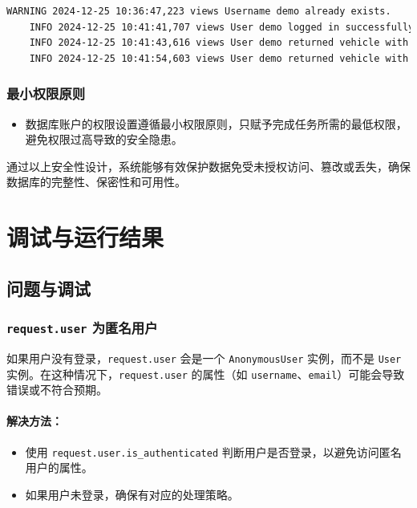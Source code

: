 \documentclass[UTF8,a4paper,12pt]{ctexart}
\begin{document}
\begin{lstlisting}[language=bash]
    WARNING 2024-12-25 10:36:47,223 views Username demo already exists.
    INFO 2024-12-25 10:41:41,707 views User demo logged in successfully.
    INFO 2024-12-25 10:41:43,616 views User demo returned vehicle with ID XPENG001.
    INFO 2024-12-25 10:41:54,603 views User demo returned vehicle with ID XPENG001.
\end{lstlisting}

\subsubsection{最小权限原则}
\begin{itemize}
    \item 数据库账户的权限设置遵循最小权限原则，只赋予完成任务所需的最低权限，避免权限过高导致的安全隐患。
\end{itemize}

通过以上安全性设计，系统能够有效保护数据免受未授权访问、篡改或丢失，确保数据库的完整性、保密性和可用性。

\section{调试与运行结果}
\subsection{问题与调试}


\subsubsection{\texttt{request.user} 为匿名用户}

如果用户没有登录，\texttt{request.user} 会是一个 \texttt{AnonymousUser} 实例，而不是 \texttt{User} 实例。在这种情况下，\texttt{request.user} 的属性（如 \texttt{username}、\texttt{email}）可能会导致错误或不符合预期。

\paragraph{解决方法：}
\begin{itemize}
    \item 使用 \texttt{request.user.is\_authenticated} 判断用户是否登录，以避免访问匿名用户的属性。
    \item 如果用户未登录，确保有对应的处理策略。
\end{itemize}
\end{document}
